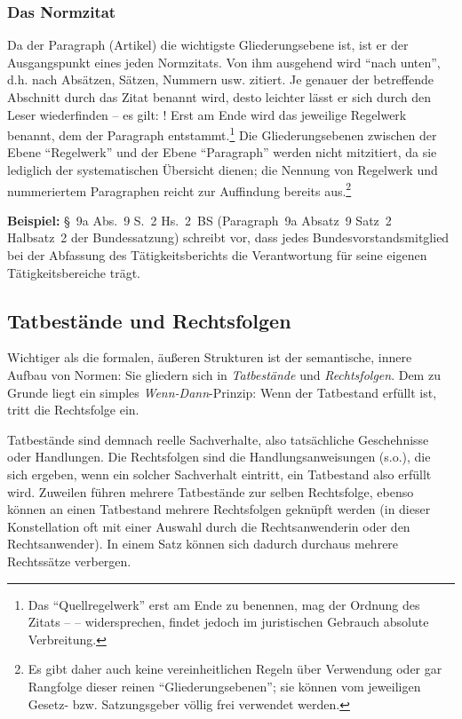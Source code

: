 \subsubsection{Das Normzitat}
Da der Paragraph (Artikel) die wichtigste Gliederungsebene ist, ist er der Ausgangspunkt eines jeden Normzitats. Von ihm ausgehend wird \enquote{nach unten}, d.h. nach Absätzen, Sätzen, Nummern usw. zitiert. Je genauer der betreffende Abschnitt durch das Zitat benannt wird, desto leichter lässt er sich durch den Leser wiederfinden – es gilt: ! Erst am Ende wird das jeweilige Regelwerk benannt, dem der Paragraph entstammt.\footnote{Das \enquote{Quellregelwerk} erst am Ende zu benennen, mag der Ordnung des Zitats –  – widersprechen, findet jedoch im juristischen Gebrauch absolute Verbreitung.} Die Gliederungsebenen zwischen der Ebene \enquote{Regelwerk} und der Ebene \enquote{Paragraph} werden nicht mitzitiert, da sie lediglich der systematischen Übersicht dienen; die Nennung von Regelwerk und nummeriertem Paragraphen reicht zur Auffindung bereits aus.\footnote{Es gibt daher auch keine vereinheitlichen Regeln über Verwendung oder gar Rangfolge dieser reinen \enquote{Gliederungsebenen}; sie können vom jeweiligen Gesetz- bzw. Satzungsgeber völlig frei verwendet werden.}

\textbf{Beispiel:} \S~9a Abs.~9 S.~2 Hs.~2~BS (Paragraph~9a Absatz~9 Satz~2 Halbsatz~2 der Bundessatzung) schreibt vor, dass jedes Bundesvorstandsmitglied bei der Abfassung des Tätigkeitsberichts die Verantwortung für seine eigenen Tätigkeitsbereiche trägt. 

\subsection{Tatbestände und Rechtsfolgen}
Wichtiger als die formalen, äußeren Strukturen ist der semantische, innere Aufbau von Normen: Sie gliedern sich in \emph{Tatbestände} und \emph{Rechtsfolgen}. Dem zu Grunde liegt ein simples \emph{Wenn-Dann}-Prinzip: Wenn der Tatbestand erfüllt ist, tritt die Rechtsfolge ein.

Tatbestände sind demnach reelle Sachverhalte, also tatsächliche Geschehnisse oder Handlungen. Die Rechtsfolgen sind die Handlungsanweisungen (s.o.), die sich ergeben, wenn ein solcher Sachverhalt eintritt, ein Tatbestand also erfüllt wird. Zuweilen führen mehrere Tatbestände zur selben Rechtsfolge, ebenso können an einen Tatbestand mehrere Rechtsfolgen geknüpft werden (in dieser Konstellation oft mit einer Auswahl durch die Rechtsanwenderin oder den Rechtsanwender). In einem Satz können sich dadurch durchaus mehrere Rechtssätze verbergen.

